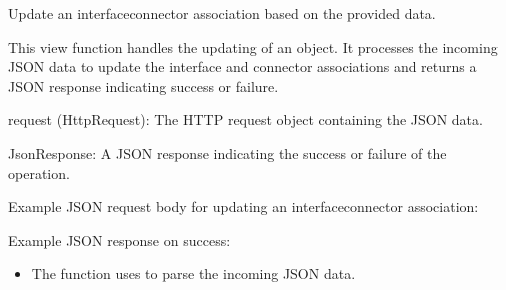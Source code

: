 \documentclass[letterpaper,10pt,english]{sphinxmanual}
\begin{document}
\begin{fulllineitems}
\label{\detokenize{app:app.views.update_interface_connector}}
\pysigstartsignatures
{}
\pysigstopsignatures
\sphinxAtStartPar
Update an interface\sphinxhyphen{}connector association based on the provided data.

\sphinxAtStartPar
This view function handles the updating of an  object. 
It processes the incoming JSON data to update the interface and connector 
associations and returns a JSON response indicating success or failure.
\begin{description}
\sphinxAtStartPar
request (HttpRequest): The HTTP request object containing the JSON data.

\sphinxAtStartPar
JsonResponse: A JSON response indicating the success or failure of the operation.

\sphinxAtStartPar
Example JSON request body for updating an interface\sphinxhyphen{}connector association:

\begin{sphinxVerbatim}[commandchars=\\\{\}]
\end{sphinxVerbatim}

\sphinxAtStartPar
Example JSON response on success:

\begin{sphinxVerbatim}[commandchars=\\\{\}]
\end{sphinxVerbatim}

\begin{itemize}
\item {} 
\sphinxAtStartPar
The function uses  to parse the incoming JSON data.


\end{itemize}
\end{description}
\end{fulllineitems}
\end{document}
